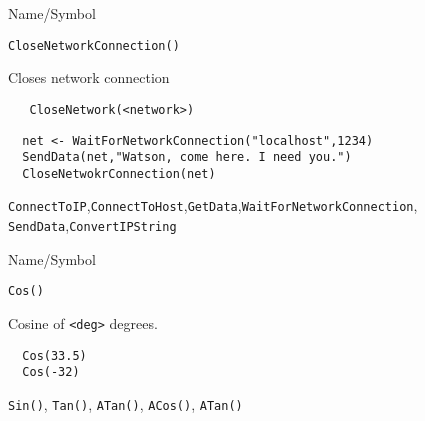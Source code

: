 \begin{desc}{Name/Symbol}
\item[Name/Symbol]	\verb+CloseNetworkConnection()+

\item[Description]	Closes network connection

\item[Usage]
\begin{verbatim}
   CloseNetwork(<network>)
\end{verbatim}

\item[Example]	

\begin{verbatim}
  net <- WaitForNetworkConnection("localhost",1234)
  SendData(net,"Watson, come here. I need you.")
  CloseNetwokrConnection(net)
\end{verbatim}

\item[See Also]
  \verb+ConnectToIP+,\verb+ConnectToHost+,\verb+GetData+,\verb+WaitForNetworkConnection+,
   \verb+SendData+,\verb+ConvertIPString+
\end{desc}

\rl



\begin{desc}{Name/Symbol}
\item[Name/Symbol]  	\verb+Cos()+
			 
\item[Description] 	Cosine of \verb+<deg>+ degrees.

\item[Usage]		
\item[Example]	
\begin{verbatim}
  Cos(33.5)
  Cos(-32)
\end{verbatim}

\item[See Also]     	\verb+Sin()+, \verb+Tan()+, \verb+ATan()+, \verb+ACos()+, \verb+ATan()+
\end{desc}

\rl


